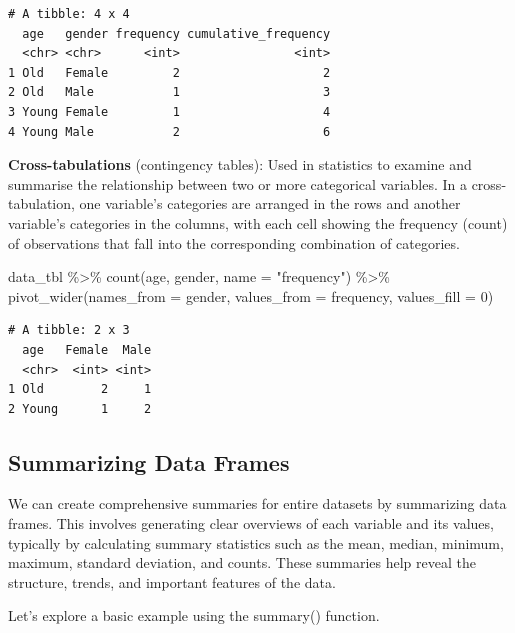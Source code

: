 \documentclass[
  man,
  floatsintext,
  longtable,
  nolmodern,
  notxfonts,
  notimes,
  colorlinks=true,linkcolor=blue,citecolor=blue,urlcolor=blue]{apa7}
\newenvironment{Shaded}{\begin{snugshade}}{\end{snugshade}}
\newcommand{\AttributeTok}[1]{\textcolor[rgb]{0.40,0.45,0.13}{#1}}
\newcommand{\DecValTok}[1]{\textcolor[rgb]{0.68,0.00,0.00}{#1}}
\newcommand{\FunctionTok}[1]{\textcolor[rgb]{0.28,0.35,0.67}{#1}}
\newcommand{\NormalTok}[1]{\textcolor[rgb]{0.00,0.23,0.31}{#1}}
\newcommand{\SpecialCharTok}[1]{\textcolor[rgb]{0.37,0.37,0.37}{#1}}
\newcommand{\StringTok}[1]{\textcolor[rgb]{0.13,0.47,0.30}{#1}}
\begin{document}
\begin{verbatim}
# A tibble: 4 x 4
  age   gender frequency cumulative_frequency
  <chr> <chr>      <int>                <int>
1 Old   Female         2                    2
2 Old   Male           1                    3
3 Young Female         1                    4
4 Young Male           2                    6
\end{verbatim}

\textbf{Cross-tabulations} (contingency tables): Used in statistics to
examine and summarise the relationship between two or more categorical
variables. In a cross-tabulation, one variable's categories are arranged
in the rows and another variable's categories in the columns, with each
cell showing the frequency (count) of observations that fall into the
corresponding combination of categories.

\begin{Shaded}
\begin{Highlighting}[]
\NormalTok{data\_tbl }\SpecialCharTok{\%\textgreater{}\%}
  \FunctionTok{count}\NormalTok{(age, gender, }\AttributeTok{name =} \StringTok{"frequency"}\NormalTok{) }\SpecialCharTok{\%\textgreater{}\%}
  \FunctionTok{pivot\_wider}\NormalTok{(}\AttributeTok{names\_from =}\NormalTok{ gender, }\AttributeTok{values\_from =}\NormalTok{ frequency, }\AttributeTok{values\_fill =} \DecValTok{0}\NormalTok{)}
\end{Highlighting}
\end{Shaded}

\begin{verbatim}
# A tibble: 2 x 3
  age   Female  Male
  <chr>  <int> <int>
1 Old        2     1
2 Young      1     2
\end{verbatim}

\subsection{Summarizing Data Frames}\label{summarizing-data-frames}

We can create comprehensive summaries for entire datasets by summarizing
data frames. This involves generating clear overviews of each variable
and its values, typically by calculating summary statistics such as the
mean, median, minimum, maximum, standard deviation, and counts. These
summaries help reveal the structure, trends, and important features of
the data.

Let's explore a basic example using the summary() function.
\end{document}
